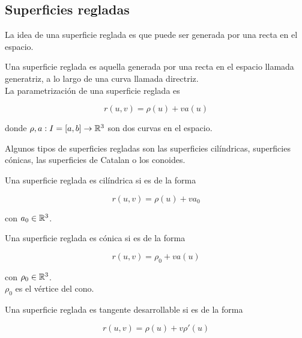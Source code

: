 \documentclass[10pt,a4paper]{article}
\begin{document}
\subsection{Superficies regladas}

La idea de una superficie reglada es que puede ser generada por una recta en el espacio.

\begin{defi}
Una superficie reglada es aquella generada por una recta en el espacio llamada generatriz, a lo largo de una curva llamada directriz.\\

La parametrización de una superficie reglada es 
			
\begin{equation}
r(u,v) = \rho(u) + v a(u)
\end{equation}

donde $\rho, a : I = [a,b] \to \mathbb{R}^3$ son dos curvas en el espacio.
\end{defi}

Algunos tipos de superficies regladas son las superficies cilíndricas, superficies cónicas, las superficies de Catalan o los conoides.

\begin{defi}
	Una superficie reglada es cilíndrica si es de la forma 
	
	\begin{equation}
	r(u,v) = \rho(u) + v a_0
	\end{equation}
	
	con $a_0 \in \mathbb{R}^3$.
\end{defi}

\begin{defi}
	Una superficie reglada es cónica si es de la forma 
	
	\begin{equation}
	r(u,v) = \rho_0 + v a(u)
	\end{equation}
	
	con $\rho_0 \in \mathbb{R}^3$.\\
	
	$\rho_0$ es el vértice del cono.
\end{defi}

\begin{defi}
	Una superficie reglada es tangente desarrollable si es de la forma 
	
	\begin{equation}
	r(u,v) = \rho(u) + v \rho'(u)
	\end{equation}
\end{defi}
\end{document}
